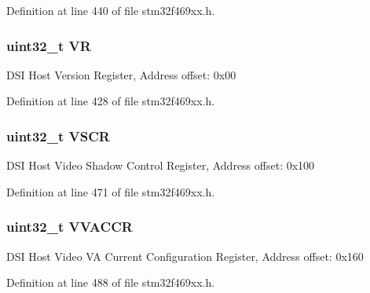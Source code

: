 Definition at line 440 of file stm32f469xx.\+h.

\subsubsection[{\texorpdfstring{VR}{VR}}]{ uint32\+\_\+t VR}\hypertarget{struct_d_s_i___type_def_a6349b3f5bd84a9d19d3de5b8c36ce900}{}\label{struct_d_s_i___type_def_a6349b3f5bd84a9d19d3de5b8c36ce900}
D\+SI Host Version Register, Address offset\+: 0x00 

Definition at line 428 of file stm32f469xx.\+h.

\subsubsection[{\texorpdfstring{V\+S\+CR}{VSCR}}]{ uint32\+\_\+t V\+S\+CR}\hypertarget{struct_d_s_i___type_def_a8ac698c8f34ec80f0a5f737a662c25b1}{}\label{struct_d_s_i___type_def_a8ac698c8f34ec80f0a5f737a662c25b1}
D\+SI Host Video Shadow Control Register, Address offset\+: 0x100 

Definition at line 471 of file stm32f469xx.\+h.

\subsubsection[{\texorpdfstring{V\+V\+A\+C\+CR}{VVACCR}}]{ uint32\+\_\+t V\+V\+A\+C\+CR}\hypertarget{struct_d_s_i___type_def_a3ce471d524b62bb455983e94114996d0}{}\label{struct_d_s_i___type_def_a3ce471d524b62bb455983e94114996d0}
D\+SI Host Video VA Current Configuration Register, Address offset\+: 0x160 

Definition at line 488 of file stm32f469xx.\+h.

